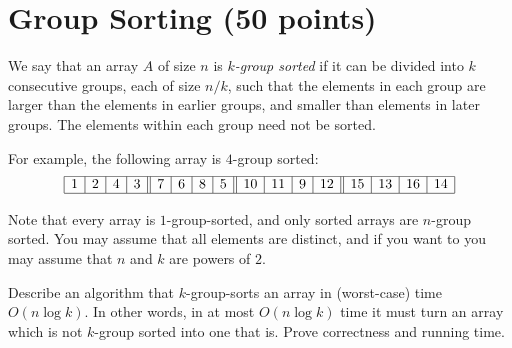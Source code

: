 \documentclass[11pt]{article}
\begin{document}
\section{Group Sorting (50 points)}
We say that an array $A$ of size $n$ is \emph{$k$-group sorted} if it can be divided into $k$ consecutive groups, each of size $n/k$, such that the elements in each group are larger than the elements in earlier groups, and smaller than elements in later groups. The elements within each group need not be sorted.   

For example, the following array is $4$-group sorted:
\[
\begin{array}{|c|c|c|c||c|c|c|c||c|c|c|c||c|c|c|c|}
\hline
1 &2 &4 &3 &7 &6 &8 &5 &10 &11 &9 &12 &15 &13 &16 &14\\
\hline
\end{array}
\]

Note that every array is $1$-group-sorted, and only sorted arrays are $n$-group sorted.  You may assume that all elements are distinct, and if you want to you may assume that $n$ and $k$ are powers of $2$. 

 Describe an algorithm that $k$-group-sorts an array in (worst-case) time $O(n \log k)$.  In other words, in at most $O(n \log k)$ time it must turn an array which is not $k$-group sorted into one that is.  Prove correctness and running time.
\end{document}
